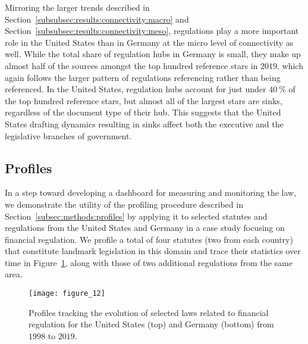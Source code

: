\begin{table}
	\centering
	
	\caption{%
		Types of the top hundred reference stars (i.e., those with the largest number of nodes) in $1998$ and $2019$ for the United States (left) and Germany (right). S-Hubs are hubs contained in statutes and R-Hubs are hubs contained in regulations.
	}\label{tab:star-statistics}
\end{table}

Mirroring the larger trends described in Section~\ref{subsubsec:results:connectivity:macro} and Section~\ref{subsubsec:results:connectivity:meso}, regulations play a more important role in the United States than in Germany at the micro level of connectivity as well. 
While the total share of regulation hubs in Germany is small, 
they make up almost half of the sources amongst the top hundred reference stars in $2019$, which again follows the larger pattern of regulations referencing rather than being referenced.
In the United States, regulation hubs account for just under $40~\%$ of the top hundred reference stars, 
but almost all of the largest stars are sinks, regardless of the document type of their hub.
This suggests that the United States drafting dynamics resulting in sinks affect both the executive and the legislative branches of government. 

\vspace*{6pt}
\subsection{Profiles}
\label{subsec:results:profiles}

In a step toward developing a dashboard for measuring and monitoring the law, 
we demonstrate the utility of the profiling procedure described in Section~\ref{subsec:methods:profiles} by applying it to selected statutes and regulations from the United States and Germany in a case study focusing on financial regulation. 
We profile a total of four statutes (two from each country) that constitute landmark legislation in this domain and trace their statistics over time in Figure~\ref{fig:profiles}, 
along with those of two additional regulations from the same area.

\begin{figure}
	\centering
	\vspace*{-8pt}\texttt{[image: figure\_12]}\vspace{-6pt}
	\caption{%
		Profiles tracking the evolution of selected laws related to financial regulation for the United States (top) and Germany (bottom) from $1998$ to $2019$.
	}\label{fig:profiles}
\end{figure}

